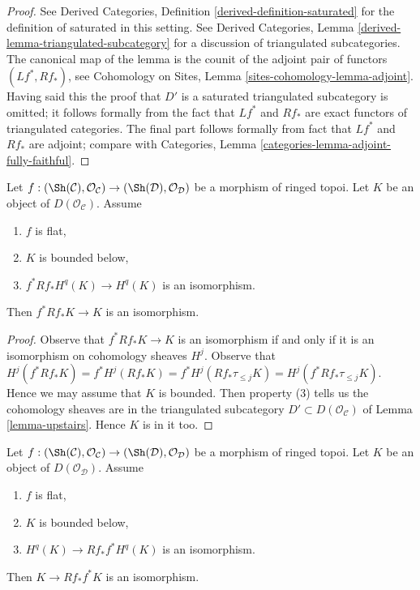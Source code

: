 \begin{proof}
See Derived Categories, Definition \ref{derived-definition-saturated}
for the definition of saturated in this setting. See
Derived Categories, Lemma \ref{derived-lemma-triangulated-subcategory}
for a discussion of triangulated subcategories.
The canonical map of the lemma is the counit of the adjoint
pair of functors $(Lf^*, Rf_*)$, see
Cohomology on Sites, Lemma \ref{sites-cohomology-lemma-adjoint}.
Having said this the proof that $D'$ is a saturated triangulated subcategory
is omitted; it follows formally from the fact that
$Lf^*$ and $Rf_*$ are exact functors of triangulated categories.
The final part follows formally from
fact that $Lf^*$ and $Rf_*$ are adjoint; compare with
Categories, Lemma \ref{categories-lemma-adjoint-fully-faithful}.
\end{proof}

\begin{lemma}
\label{lemma-bounded-in-image-upstairs}
Let $f : (\Sh(\mathcal{C}), \mathcal{O}_\mathcal{C}) \to
(\Sh(\mathcal{D}), \mathcal{O}_\mathcal{D})$ be a morphism of ringed topoi.
Let $K$ be an object of $D(\mathcal{O}_\mathcal{C})$. Assume
\begin{enumerate}
\item $f$ is flat,
\item $K$ is bounded below,
\item $f^*Rf_*H^q(K) \to H^q(K)$ is an isomorphism.
\end{enumerate}
Then $f^*Rf_*K \to K$ is an isomorphism.
\end{lemma}

\begin{proof}
Observe that $f^*Rf_*K \to K$ is an isomorphism if and only
if it is an isomorphism on cohomology sheaves $H^j$. Observe that
$H^j(f^*Rf_*K) = f^*H^j(Rf_*K) = f^*H^j(Rf_*\tau_{\leq j}K) =
H^j(f^*Rf_*\tau_{\leq j}K)$.
Hence we may assume that $K$ is bounded. Then property (3)
tells us the cohomology sheaves are in the triangulated
subcategory $D' \subset D(\mathcal{O}_\mathcal{C})$ of
Lemma \ref{lemma-upstairs}. Hence $K$ is in it too.
\end{proof}

\begin{lemma}
\label{lemma-bounded-in-image-downstairs}
Let $f : (\Sh(\mathcal{C}), \mathcal{O}_\mathcal{C}) \to
(\Sh(\mathcal{D}), \mathcal{O}_\mathcal{D})$ be a morphism of ringed topoi.
Let $K$ be an object of $D(\mathcal{O}_\mathcal{D})$. Assume
\begin{enumerate}
\item $f$ is flat,
\item $K$ is bounded below,
\item $H^q(K) \to Rf_*f^*H^q(K)$ is an isomorphism.
\end{enumerate}
Then $K \to Rf_*f^*K$ is an isomorphism.
\end{lemma}

